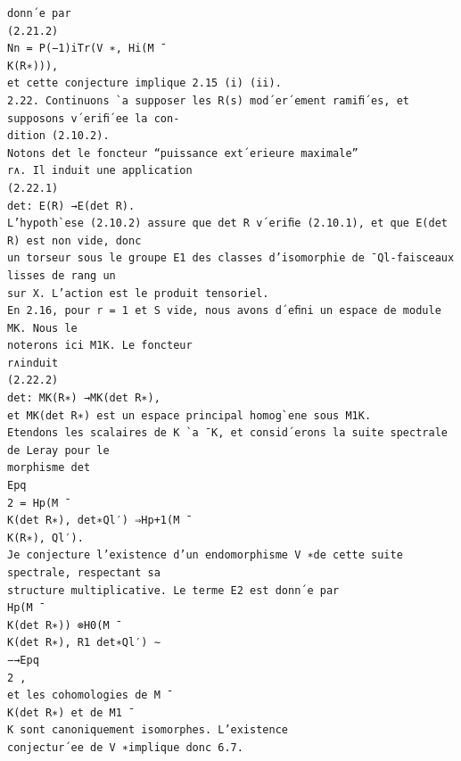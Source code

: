 \documentclass[11pt]{article}
\begin{document}
\begin{Verbatim}[breaklines=true,fontsize=\small]
donn´e par
(2.21.2)
Nn = P(−1)iTr(V ∗, Hi(M ¯
K(R∗))),
et cette conjecture implique 2.15 (i) (ii).
2.22. Continuons `a supposer les R(s) mod´er´ement ramiﬁ´es, et supposons v´eriﬁ´ee la con-
dition (2.10.2).
Notons det le foncteur “puissance ext´erieure maximale”
r∧. Il induit une application
(2.22.1)
det: E(R) →E(det R).
L’hypoth`ese (2.10.2) assure que det R v´eriﬁe (2.10.1), et que E(det R) est non vide, donc
un torseur sous le groupe E1 des classes d’isomorphie de ¯Ql-faisceaux lisses de rang un
sur X. L’action est le produit tensoriel.
En 2.16, pour r = 1 et S vide, nous avons d´eﬁni un espace de module MK. Nous le
noterons ici M1K. Le foncteur
r∧induit
(2.22.2)
det: MK(R∗) →MK(det R∗),
et MK(det R∗) est un espace principal homog`ene sous M1K.
Etendons les scalaires de K `a ¯K, et consid´erons la suite spectrale de Leray pour le
morphisme det
Epq
2 = Hp(M ¯
K(det R∗), det∗Ql′) ⇒Hp+1(M ¯
K(R∗), Ql′).
Je conjecture l’existence d’un endomorphisme V ∗de cette suite spectrale, respectant sa
structure multiplicative. Le terme E2 est donn´e par
Hp(M ¯
K(det R∗)) ⊗H0(M ¯
K(det R∗), R1 det∗Ql′) ∼
−→Epq
2 ,
et les cohomologies de M ¯
K(det R∗) et de M1 ¯
K sont canoniquement isomorphes. L’existence
conjectur´ee de V ∗implique donc 6.7.


\end{Verbatim}
\end{document}
